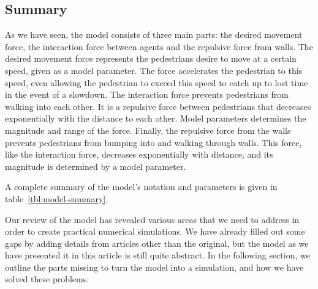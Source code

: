 \subsection{Summary}
As we have seen, the model consists of three main parts: the desired movement 
force, the interaction force between agents and the repulsive force from 
walls. The desired movement force represents the pedestrians desire to move at 
a certain speed, given as a model parameter. The force accelerates the 
pedestrian to this speed, even allowing the pedestrian to exceed this speed to 
catch up to lost time in the event of a slowdown. The interaction force 
prevents pedestrians from walking into each other. It is a repulsive force 
between pedestrians that decreases exponentially with the distance to each 
other. Model parameters determines the magnitude and range of the force. 
Finally, the repulsive force from the walls prevents pedestrians from bumping 
into and walking through walls. This force, like the interaction force, 
decreases exponentially with distance, and its magnitude is determined by a 
model parameter.

A complete summary of the model's notation and parameters is given in 
table~\ref{tbl:model-summary}.

Our review of the model has revealed various areas that we need to address in 
order to create practical numerical simulations. We have already filled out 
some gaps by adding details from articles other than the original, but the 
model as we have presented it in this article is still quite abstract. In the 
following section, we outline the parts missing to turn the model into a 
simulation, and how we have solved these problems.


